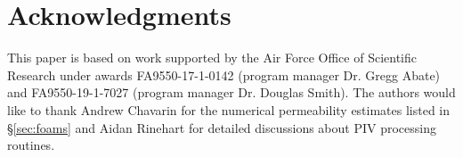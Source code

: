 \documentclass[letterpaper,11pt]{article}
\begin{document}




\section*{Acknowledgments}
This paper is based on work supported by the Air Force Office of Scientific Research under awards FA9550-17-1-0142 (program manager Dr. Gregg Abate) and FA9550-19-1-7027 (program manager Dr. Douglas Smith). The authors would like to thank Andrew Chavarin for the numerical permeability estimates listed in \S\ref{sec:foams} and Aidan Rinehart for detailed discussions about PIV processing routines.




\end{document}
